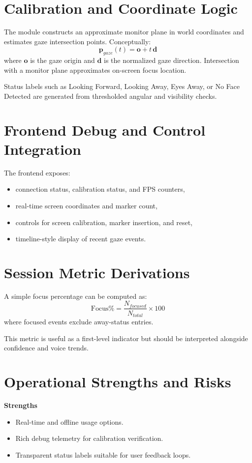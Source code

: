 \documentclass[12pt,a4paper]{report}
\begin{document}
\section{Calibration and Coordinate Logic}
The module constructs an approximate monitor plane in world coordinates and estimates gaze intersection points. Conceptually:
\begin{equation}
\mathbf{p}_{gaze}(t) = \mathbf{o} + t\,\mathbf{d}
\end{equation}
where $\mathbf{o}$ is the gaze origin and $\mathbf{d}$ is the normalized gaze direction. Intersection with a monitor plane approximates on-screen focus location.

Status labels such as Looking Forward, Looking Away, Eyes Away, or No Face Detected are generated from thresholded angular and visibility checks.

\section{Frontend Debug and Control Integration}
The frontend exposes:
\begin{itemize}[leftmargin=1.5em]
\item connection status, calibration status, and FPS counters,
\item real-time screen coordinates and marker count,
\item controls for screen calibration, marker insertion, and reset,
\item timeline-style display of recent gaze events.
\end{itemize}

\section{Session Metric Derivations}
A simple focus percentage can be computed as:
\begin{equation}
\text{Focus\%} = \frac{N_{focused}}{N_{total}} \times 100
\end{equation}
where focused events exclude away-status entries.

This metric is useful as a first-level indicator but should be interpreted alongside confidence and voice trends.

\section{Operational Strengths and Risks}
\textbf{Strengths}
\begin{itemize}[leftmargin=1.5em]
\item Real-time and offline usage options.
\item Rich debug telemetry for calibration verification.
\item Transparent status labels suitable for user feedback loops.
\end{itemize}
\end{document}
